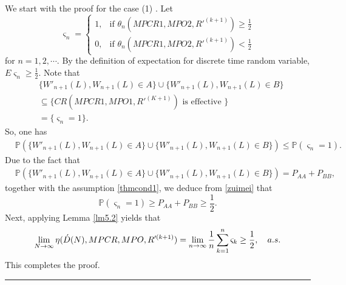 \documentclass[11pt]{article}
\newcommand{\fin}{\hspace*{\fill}\rule{0.3em}{1ex}}
\newenvironment{proof}{{\bf \noindent Proof.}}{\fin}
\numberwithin{equation}{section}
\begin{document}
\begin{proof}
We start with the proof for the case (1) . Let
\begin{equation}
\varsigma_n=
\begin{cases}
1, & \text{if } \theta_n(MPCR1,MPO2,R'^{(k+1)}) \geq \frac{1}{2} \\
0,  & \text{if } \theta_n(MPCR1,MPO2,R'^{(k+1)}) < \frac{1}{2}
\end{cases}
\end{equation}
for $n=1,2,\cdots$. By the definition of expectation for discrete time random variable, $E\varsigma_n\ge\frac{1}{2}$.
Note that 
\begin{equation*}
\begin{split}
&\{W'_{n+1}(L),W_{n+1}(L)\in A\}\cup \{W'_{n+1}(L),W_{n+1}(L)\in B\}\\
&\subseteq\{CR(MPCR1, MPO1,R'^{(K+1)})  \mbox{ is effective }\}\\
&=\{\varsigma_n=1\}.
\end{split}
\end{equation*}
So, one has 
\begin{equation}\label{zuimei}
\begin{split}
&\mathbb{P}(\{W'_{n+1}(L),W_{n+1}(L)\in A\}\cup \{W'_{n+1}(L),W_{n+1}(L)\in B\})
\le \mathbb{P}(\varsigma_n=1).
\end{split}
\end{equation}
Due to the fact that 
\begin{equation*}
\begin{split}
&\mathbb{P}(\{W'_{n+1}(L),W_{n+1}(L)\in A\}\cup \{W'_{n+1}(L),W_{n+1}(L)\in B\})
=P_{AA}+P_{BB},
\end{split}
\end{equation*}
together with the assumption \eqref{thmcond1}, we deduce from \eqref{zuimei} that 
\begin{equation*}
\mathbb{P}(\varsigma_n=1)\geq P_{AA}+P_{BB}\geq\frac{1}{2}.
\end{equation*}
Next, applying Lemma \ref{lm5.2} yields that 
\begin{equation*}
\lim_{N\rightarrow \infty} \eta (\\\acute{D}(N),MPCR,MPO,R'^{(k+1)})=\lim_{n\rightarrow \infty}\frac{1}{n} \sum_{k=1}^n \varsigma_k\geq \frac{1}{2}, \quad a.s.
\end{equation*}
This completes the proof.


\end{proof}
\end{document}
